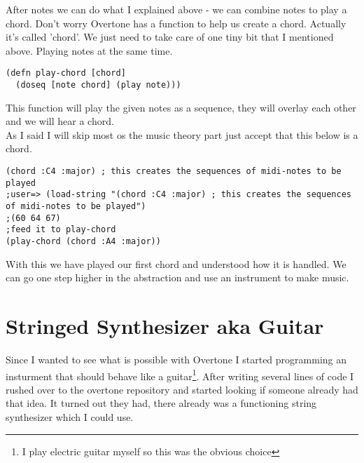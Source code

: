 After notes we can do what I explained above - we can combine notes to play a chord. Don't worry Overtone has a function to help us create a chord. Actually it's called 'chord'.
We just need to take care of one tiny bit that I mentioned above. Playing notes at the same time.
\begin{lstlisting}
(defn play-chord [chord]
  (doseq [note chord] (play note)))
\end{lstlisting}
This function will play the given notes as a sequence, they will overlay each other and we will hear a chord.\\

As I said I will skip most os the music theory part just accept that this below is a chord.
\begin{lstlisting}
(chord :C4 :major) ; this creates the sequences of midi-notes to be played
;user=> (load-string "(chord :C4 :major) ; this creates the sequences of midi-notes to be played")
;(60 64 67)
;feed it to play-chord
(play-chord (chord :A4 :major))
\end{lstlisting} 

With this we have played our first chord and understood how it is handled. We can go one step higher in the abstraction and use an instrument to make music.

\section{Stringed Synthesizer aka Guitar}
Since I wanted to see what is possible with Overtone I started programming an insturment that should behave like a guitar\footnote{I play electric guitar myself so this was the obvious choice}. After writing several lines of code I rushed over to the overtone repository\cite{osr} and started looking if someone already had that idea. It turned out they had, there already was a functioning string synthesizer which I could use.


